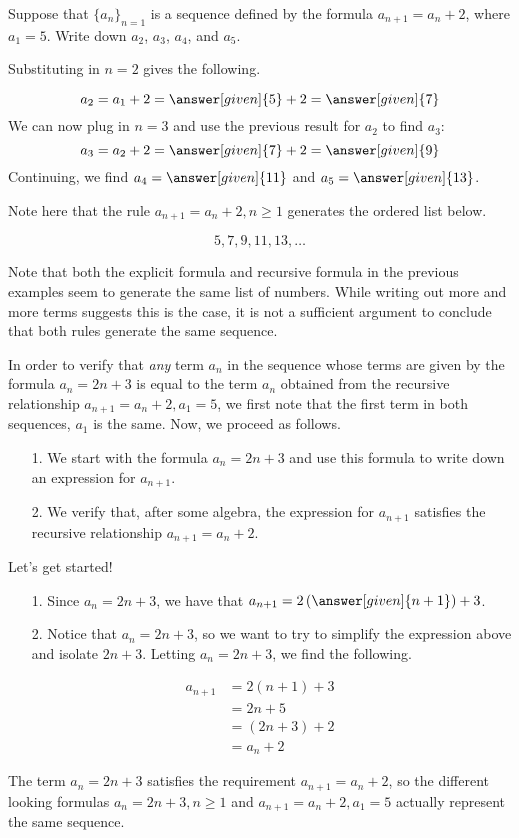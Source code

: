 \documentclass{ximera}
\begin{document}
\begin{example}
 Suppose that $\{a_n\}_{n=1}$ is a sequence defined by the formula $a_{n+1} = a_n+2$, where $a_1 = 5$.  Write down $a_2$, $a_3$, $a_4$, and $a_5$.  
 
 \begin{explanation}
 Substituting in $n=2$ gives the following.
 
 \[
 a_2 = a_{1}+2 = \answer[given]{5}+2 = \answer[given]{7}
 \]
 We can now plug in $n=3$ and use the previous result for $a_2$ to find $a_3$:
  \[
 a_3 = a_{2}+2 = \answer[given]{7}+2 = \answer[given]{9}
 \]
 Continuing, we find $a_4 = \answer[given]{11}$ and $a_5 = \answer[given]{13}$.
 
\end{explanation}

Note here that the rule $a_{n+1} = a_n+2, n \geq 1$ generates the ordered list below.

\[
5,7,9,11,13, \dots
\]   

Note that both the explicit formula and recursive formula in the previous examples seem to generate the same list of numbers.  While writing out more and more terms suggests this is the case, it is not a sufficient argument to conclude that both rules generate the same sequence.  

In order to verify that \emph{any} term $a_n$ in the sequence whose terms are given by the formula $a_n = 2n+3$ is equal to the term $a_n$ obtained from the recursive relationship $a_{n+1}=a_n+2, a_1=5$, we first note that the first term in both sequences, $a_1$ is the same. Now, we proceed as follows.

\begin{itemize}
\item[1.] We start with the formula $a_n=2n+3$ and use this formula to write down an expression for $a_{n+1}$.
\item[2.] We verify that, after some algebra, the expression for $a_{n+1}$ satisfies the recursive relationship $a_{n+1} = a_n+2$.
\end{itemize}

Let's get started!

\begin{itemize}
\item[1.] Since $a_n=2n+3$, we have that $a_{n+1} = 2\left(\answer[given]{n+1}\right)+3$.
\item[2.] Notice that $a_n = 2n+3$, so we want to try to simplify the expression above and isolate $2n+3$.  
Letting $a_n = 2n+3$, we find the following.
\end{itemize}

\begin{align*}
a_{n+1} &= 2\left(n+1\right)+3 \\
&= 2n+5 \\
&= \left(2n+3\right) +2 \\
&= a_n+2
\end{align*}  

The term $a_n = 2n+3$ satisfies the requirement $a_{n+1}=a_n+2$, so the different looking formulas $a_n = 2n+3, n \geq 1$ and $a_{n+1}=a_n+2, a_1=5$ actually represent the same sequence.
\end{example}
\end{document}
